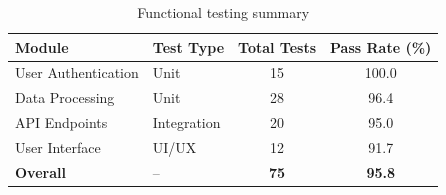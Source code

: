 \begin{table}[H]
    \centering
    \caption{Functional testing summary}
    \label{tab:functional_tests}
    \begin{tabular}{@{}llcc@{}}
        \toprule
        \textbf{Module} & \textbf{Test Type} & \textbf{Total Tests} & \textbf{Pass Rate (\%)} \\
        \midrule
        User Authentication & Unit & 15 & 100.0 \\
        Data Processing & Unit & 28 & 96.4 \\
        API Endpoints & Integration & 20 & 95.0 \\
        User Interface & UI/UX & 12 & 91.7 \\
        \midrule
        \textbf{Overall} & -- & \textbf{75} & \textbf{95.8} \\
        \bottomrule
    \end{tabular}
\end{table}